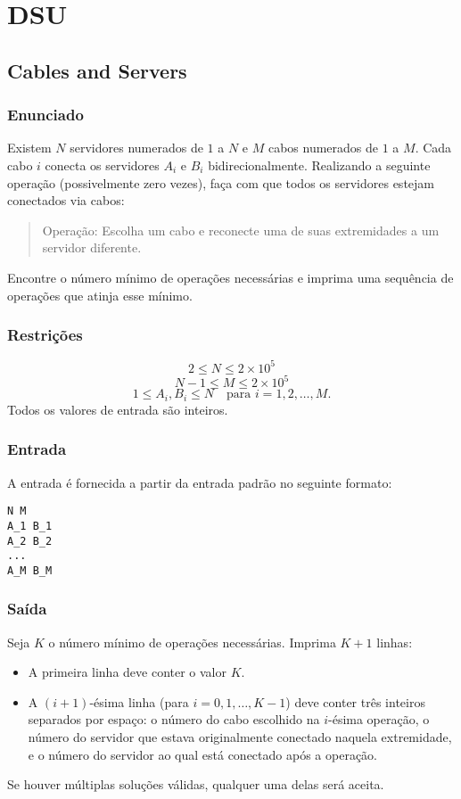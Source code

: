 \section{DSU}
\subsection{Cables and Servers}

\subsubsection*{Enunciado}
Existem \(N\) servidores numerados de \(1\) a \(N\) e \(M\) cabos numerados de \(1\) a \(M\).  
Cada cabo \(i\) conecta os servidores \(A_i\) e \(B_i\) bidirecionalmente.  
Realizando a seguinte operação (possivelmente zero vezes), faça com que todos os servidores estejam conectados via cabos:
\begin{quote}
Operação: Escolha um cabo e reconecte uma de suas extremidades a um servidor diferente.
\end{quote}
Encontre o número mínimo de operações necessárias e imprima uma sequência de operações que atinja esse mínimo.

\subsubsection*{Restrições}
\[
2 \leq N \leq 2 \times 10^5
\]
\[
N-1 \leq M \leq 2 \times 10^5
\]
\[
1 \leq A_i, B_i \leq N \quad \text{para } i=1,2,\dots,M.
\]
Todos os valores de entrada são inteiros.

\subsubsection*{Entrada}
A entrada é fornecida a partir da entrada padrão no seguinte formato:
\begin{verbatim}
N M
A_1 B_1
A_2 B_2
...
A_M B_M
\end{verbatim}

\subsubsection*{Saída}
Seja \(K\) o número mínimo de operações necessárias. Imprima \(K+1\) linhas:
\begin{itemize}
    \item A primeira linha deve conter o valor \(K\).
    \item A \((i+1)\)-ésima linha (para \(i=0,1,\dots,K-1\)) deve conter três inteiros separados por espaço: o número do cabo escolhido na \(i\)-ésima operação, o número do servidor que estava originalmente conectado naquela extremidade, e o número do servidor ao qual está conectado após a operação.
\end{itemize}
Se houver múltiplas soluções válidas, qualquer uma delas será aceita.


